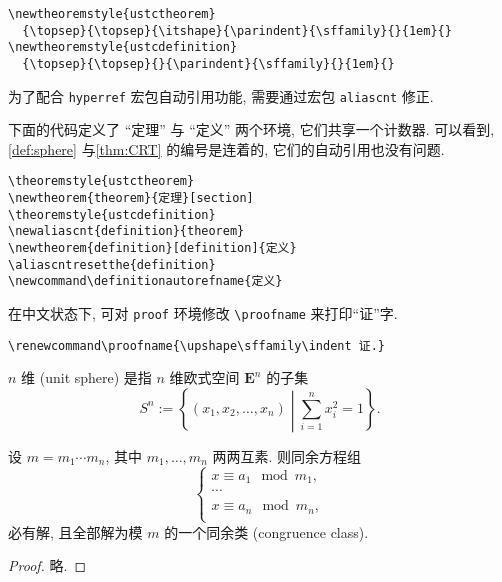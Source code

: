 \begin{verbatim}
\newtheoremstyle{ustctheorem}
  {\topsep}{\topsep}{\itshape}{\parindent}{\sffamily}{}{1em}{}
\newtheoremstyle{ustcdefinition}
  {\topsep}{\topsep}{}{\parindent}{\sffamily}{}{1em}{}
\end{verbatim}

为了配合 \verb|hyperref| 宏包自动引用功能, 需要通过宏包 \verb|aliascnt| 修正.

下面的代码定义了 ``定理'' 与 ``定义'' 两个环境, 它们共享一个计数器.
可以看到, \autoref{def:sphere} 与\autoref{thm:CRT} 的编号是连着的, 它们的自动引用也没有问题.

\begin{verbatim}
\theoremstyle{ustctheorem}
\newtheorem{theorem}{定理}[section]
\theoremstyle{ustcdefinition}
\newaliascnt{definition}{theorem}
\newtheorem{definition}[definition]{定义}
\aliascntresetthe{definition}
\newcommand\definitionautorefname{定义}
\end{verbatim}

在中文状态下, 可对 \verb|proof| 环境修改 \verb|\proofname| 来打印“证”字.
\begin{verbatim}
\renewcommand\proofname{\upshape\sffamily\indent 证.}
\end{verbatim}

\begin{definition}\label{def:sphere}
  $n$ 维 (unit sphere) 是指 $n$ 维欧式空间 $\boldsymbol{E}^n$ 的子集
  \[
    S^n :=
    \left\{
    (x_1, x_2, \dots, x_n)
    \middle|
    \sum_{i=1}^n x_i^2 = 1
    \right\}.
  \]
\end{definition}

\begin{theorem}[中国剩余定理]\label{thm:CRT}
  设 $m = m_1 \cdots m_n$, 其中 $m_1, \dots, m_n$ 两两互素. 则同余方程组
  \begin{equation}
    \left\{
    \begin{matrix}
      x \equiv a_1 \mod m_1, \\
      \cdots \\
      x \equiv a_n \mod m_n, \\
    \end{matrix}
    \right.
  \end{equation}
  必有解, 且全部解为模 $m$ 的一个同余类 (congruence class).
\end{theorem}

\begin{proof}
  略.
\end{proof}

